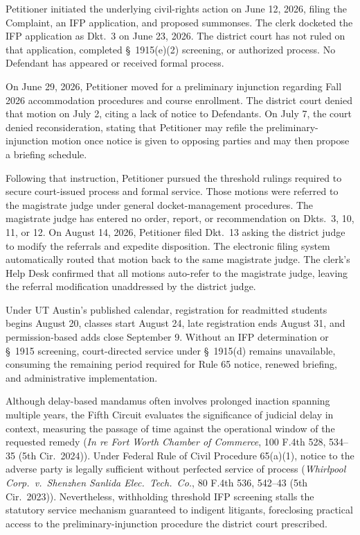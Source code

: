 \documentclass[14pt]{extarticle}
\begin{document}
Petitioner initiated the underlying civil-rights action on June 12, 2026, filing the Complaint, an IFP application, and proposed summonses. The clerk docketed the IFP application as Dkt.\ 3 on June 23, 2026. The district court has not ruled on that application, completed \S\ 1915(e)(2) screening, or authorized process. No Defendant has appeared or received formal process.

On June 29, 2026, Petitioner moved for a preliminary injunction regarding Fall 2026 accommodation procedures and course enrollment. The district court denied that motion on July 2, citing a lack of notice to Defendants. On July 7, the court denied reconsideration, stating that Petitioner may refile the preliminary-injunction motion once notice is given to opposing parties and may then propose a briefing schedule.

Following that instruction, Petitioner pursued the threshold rulings required to secure court-issued process and formal service. Those motions were referred to the magistrate judge under general docket-management procedures. The magistrate judge has entered no order, report, or recommendation on Dkts.\ 3, 10, 11, or 12. On August 14, 2026, Petitioner filed Dkt.\ 13 asking the district judge to modify the referrals and expedite disposition. The electronic filing system automatically routed that motion back to the same magistrate judge. The clerk's Help Desk confirmed that all motions auto-refer to the magistrate judge, leaving the referral modification unaddressed by the district judge.

Under UT Austin's published calendar, registration for readmitted students begins August 20, classes start August 24, late registration ends August 31, and permission-based adds close September 9. Without an IFP determination or \S\ 1915 screening, court-directed service under \S\ 1915(d) remains unavailable, consuming the remaining period required for Rule 65 notice, renewed briefing, and administrative implementation.

Although delay-based mandamus often involves prolonged inaction spanning multiple years, the Fifth Circuit evaluates the significance of judicial delay in context, measuring the passage of time against the operational window of the requested remedy (\textit{In re Fort Worth Chamber of Commerce}, 100 F.4th 528, 534--35 (5th Cir.\ 2024)). Under Federal Rule of Civil Procedure 65(a)(1), notice to the adverse party is legally sufficient without perfected service of process (\textit{Whirlpool Corp.\ v.\ Shenzhen Sanlida Elec.\ Tech.\ Co.}, 80 F.4th 536, 542--43 (5th Cir.\ 2023)). Nevertheless, withholding threshold IFP screening stalls the statutory service mechanism guaranteed to indigent litigants, foreclosing practical access to the preliminary-injunction procedure the district court prescribed.
\end{document}
